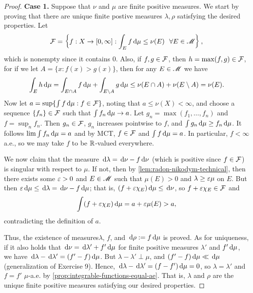 \documentclass[12pt]{article} %
\begin{document}
\begin{proof}
    \textbf{Case 1.} Suppose that $\nu$ and $\mu$ are finite positive measures. We start by proving that there are unique finite postive measures $\lambda, \rho$ satisfying the desired properties. Let \[\mathcal{F} = \left\{f : X \to [0,\infty] : \int_E f \, \mathrm{d} \mu \leq \nu(E) \ \ \forall E \in \mathscr{M}\right\},\] which is nonempty since it contains $0$. Also, if $f, g \in \mathcal{F}$, then $h = \max(f, g) \in \mathcal{F}$, for if we let $A = \{x : f(x) > g(x)\}$, then for any $E \in \mathscr{M}$ we have \[\int_E h \, \mathrm{d} \mu = \int_{E \cap A} f \, \mathrm{d} \mu + \int_{E \setminus A}g \, \mathrm{d} \mu \leq \nu(E \cap A) + \nu(E \setminus A) = \nu(E).\] Now let $a = \sup\{\int f \, \mathrm{d} \mu : f \in \mathcal{F}\}$, noting that $a \leq \nu(X) < \infty$, and choose a sequence $\{f_n\} \in \mathcal{F}$ such that $\int f_n \, \mathrm{d} \mu \to a$. Let $g_n = \max(f_1, \ldots, f_n)$ and $f = \sup_n f_n$. Then $g_n \in \mathcal{F}$, $g_n$ increases pointwise to $f$, and $\int g_n \, \mathrm{d} \mu \geq f_n \, \mathrm{d} \mu$. It follows $\lim \int f_n \, \mathrm{d} \mu = a$ and by MCT, $f \in \mathcal{F}$ and $\int f \, \mathrm{d} \mu = a$. In particular, $f < \infty$ a.e., so we may take $f$ to be $\mathbb{R}$-valued everywhere.

    We now claim that the measure $\, \mathrm{d} \lambda = \, \mathrm{d} \nu - f \, \mathrm{d} \nu$ (which is positive since $f \in \mathcal{F}$) is singular with respect to $\mu$. If not, then by \cref{lem:radon-nikodym-technical}, then there exists some $\varepsilon > 0$ and $E \in \mathscr{M}$ such that $\mu(E) > 0$ and $\lambda \geq \varepsilon\mu$ on $E$. But then $\varepsilon \, \mathrm{d} \mu \leq \, \mathrm{d} \lambda = \, \mathrm{d}\nu - f \, \mathrm{d}\mu$; that is, $(f + \varepsilon \chi_E) \, \mathrm{d} \mu \leq \, \mathrm{d}\nu$, so $f + \varepsilon \chi_E \in \mathcal{F}$ and \[\int (f + \varepsilon \chi_E) \, \mathrm{d} \mu = a + \varepsilon \mu(E) > a,\] contradicting the definition of $a$.

    Thus, the existence of measures$\lambda$, $f$, and $\, \mathrm{d} \rho := f \, \mathrm{d} \mu$ is proved. As for uniqueness, if it also holds that $\, \mathrm{d} \nu = \, \mathrm{d} \lambda' + f' \, \mathrm{d} \mu$ for finite positive measures $\lambda'$ and $f' \, \mathrm{d} \mu$, we have $\, \mathrm{d}\lambda - \, \mathrm{d} \lambda' = (f' - f)\, \mathrm{d} \mu$. But $\lambda - \lambda' \perp \mu$, and $(f' - f)\, \mathrm{d} \mu \ll \, \mathrm{d} \mu$ (generalization of Exercise 9). Hence, $\, \mathrm{d} \lambda - \, \mathrm{d} \lambda' = (f - f')\, \mathrm{d} \mu = 0$, so $\lambda = \lambda'$ and $f = f'$ $\mu$-a.e. by \cref{prop:integrable-functions-equal-ae}. That is, $\lambda$ and $\rho$ are the unique finite positive measures satisfying our desired properties.


\end{proof}
\end{document}
